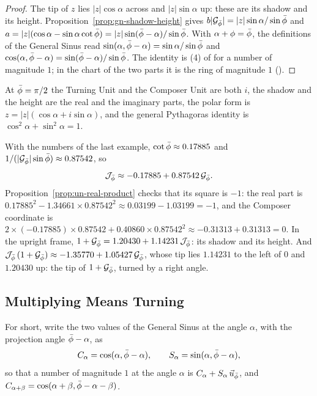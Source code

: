 \begin{proof}
The tip of $z$ lies $|z|\cos\alpha$ across and $|z|\sin\alpha$ up: these are its shadow and its height. Proposition~\ref{prop:gn-shadow-height} gives $b|\mathcal{G}_{\bar{\phi}}| = |z|\sin\alpha/\sin\bar{\phi}$ and $a = |z|(\cos\alpha - \sin\alpha\cot\bar{\phi}) = |z|\sin(\bar{\phi} - \alpha)/\sin\bar{\phi}$. With $\alpha + \phi = \bar{\phi}$, the definitions of the General Sinus read $\sin(\alpha, \bar{\phi} - \alpha) = \sin\alpha/\sin\bar{\phi}$ and $\cos(\alpha, \bar{\phi} - \alpha) = \sin(\bar{\phi} - \alpha)/\sin\bar{\phi}$. The identity is (4) of  for a number of magnitude $1$; in the chart of the two parts it is the ring of magnitude $1$ ().
\end{proof}

\incomplex At $\bar{\phi} = \pi/2$ the Turning Unit and the Composer Unit are both $i$, the shadow and the height are the real and the imaginary parts, the polar form is $z = |z|(\cos\alpha + i\sin\alpha)$, and the general Pythagoras identity is $\cos^2\alpha + \sin^2\alpha = 1$.

\begin{workedexample}
With the numbers of the last example, $\cot\bar{\phi} \approx 0.17885$ and $1/(|\mathcal{G}_{\bar{\phi}}|\sin\bar{\phi}) \approx 0.87542$, so
\[
\mathcal{J}_{\bar{\phi}} \approx -0.17885 + 0.87542\,\mathcal{G}_{\bar{\phi}} .
\]
Proposition~\ref{prop:un-real-product} checks that its square is $-1$: the real part is $0.17885^2 - 1.34661 \times 0.87542^2 \approx 0.03199 - 1.03199 = -1$, and the Composer coordinate is $2 \times (-0.17885) \times 0.87542 + 0.40860 \times 0.87542^2 \approx -0.31313 + 0.31313 = 0$. In the upright frame, $1 + \mathcal{G}_{\bar{\phi}} = 1.20430 + 1.14231\,\mathcal{J}_{\bar{\phi}}$: its shadow and its height. And $\mathcal{J}_{\bar{\phi}}\,(1 + \mathcal{G}_{\bar{\phi}}) \approx -1.35770 + 1.05427\,\mathcal{G}_{\bar{\phi}}$, whose tip lies $1.14231$ to the left of $0$ and $1.20430$ up: the tip of $1 + \mathcal{G}_{\bar{\phi}}$, turned by a right angle.
\end{workedexample}

\subsection{Multiplying Means Turning}\label{subsec:gn-turning}

For short, write the two values of the General Sinus at the angle $\alpha$, with the projection angle $\bar{\phi} - \alpha$, as
\[
C_\alpha = \cos(\alpha, \bar{\phi} - \alpha) , \qquad S_\alpha = \sin(\alpha, \bar{\phi} - \alpha) ,
\]
so that a number of magnitude $1$ at the angle $\alpha$ is $C_\alpha + S_\alpha\,\vec{u}_{\bar{\phi}}$, and $C_{\alpha + \beta} = \cos(\alpha + \beta, \bar{\phi} - \alpha - \beta)$.

